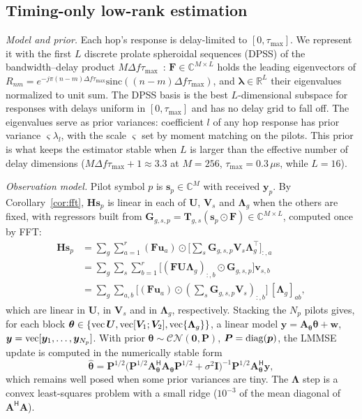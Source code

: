 \subsection{Timing-only low-rank estimation}\label{sec:est}
\emph{Model and prior.} Each hop's response is delay-limited to $[0,\tau_{\max}]$. We
represent it with the first $L$ discrete prolate spheroidal sequences (DPSS) of the
bandwidth--delay product $M\Delta f\tau_{\max}$~\cite{slepian1978,zemen2005}: $\bm F\in\mathbb C^{M\times L}$
holds the leading eigenvectors of $R_{nm}=e^{-j\pi(n-m)\Delta f\tau_{\max}}\mathrm{sinc}((n-m)\Delta f\tau_{\max})$,
and $\bm\lambda\in\mathbb R^{L}$ their eigenvalues normalized to unit sum. The DPSS basis is
the best $L$-dimensional subspace for responses with delays uniform in $[0,\tau_{\max}]$ and
has no delay grid to fall off. The eigenvalues serve as prior variances: coefficient $l$
of any hop response has prior variance $\varsigma\lambda_l$, with the scale $\varsigma$ set by
moment matching on the pilots. This prior is what keeps the estimator stable when $L$ is
larger than the effective number of delay dimensions ($M\Delta f\tau_{\max}+1\approx3.3$ at
$M=256$, $\tau_{\max}=0.3\,\mu$s, while $L=16$).

\emph{Observation model.} Pilot symbol $p$ is $\bm s_p\in\mathbb C^M$ with received $\bm y_p$.
By Corollary~\ref{cor:fft}, $\bm H\bm s_p$ is linear in each of $\bm U$, $\bm V_s$ and $\bm\Lambda_g$
when the others are fixed, with regressors built from
$\bm G_{g,s,p}=\bm T_{g,s}(\bm s_p\odot\bm F)\in\mathbb C^{M\times L}$, computed once by FFT:
\begin{align}
\bm H\bm s_p&=\textstyle\sum_g\sum_{a=1}^{r}(\bm F\bm u_a)\odot\big[\textstyle\sum_s\bm G_{g,s,p}\bm V_s\bm\Lambda_g^{\top}\big]_{:,a}\label{eq:linU}\\
&=\textstyle\sum_g\sum_s\sum_{b=1}^{r}\big[(\bm F\bm U\bm\Lambda_g)_{:,b}\odot\bm G_{g,s,p}\big]\bm v_{s,b}\label{eq:linV}\\
&=\textstyle\sum_g\sum_{a,b}\big[(\bm F\bm u_a)\odot(\textstyle\sum_s\bm G_{g,s,p}\bm V_s)_{:,b}\big]\,[\bm\Lambda_g]_{ab},\label{eq:linL}
\end{align}
which are linear in $\bm U$, in $\bm V_s$ and in $\bm\Lambda_g$, respectively.
Stacking the $N_p$ pilots gives, for each block $\bm\theta\in\{\operatorname{vec}\bm U,\operatorname{vec}[\bm V_1;\bm V_2],\operatorname{vec}\{\bm\Lambda_g\}\}$,
a linear model $\bm y=\bm A_{\bm\theta}\bm\theta+\bm w$, $\bm y=\operatorname{vec}[\bm y_1,\dots,\bm y_{N_p}]$.
With prior $\bm\theta\sim\mathcal{CN}(\bm 0,\bm P)$, $\bm P=\operatorname{diag}(\bm p)$, the LMMSE update is computed in
the numerically stable form
\begin{equation}
\hat{\bm\theta}=\bm P^{1/2}\big(\bm P^{1/2}\bm A_{\bm\theta}^{\mathsf H}\bm A_{\bm\theta}\bm P^{1/2}+\sigma^2\bm I\big)^{-1}\bm P^{1/2}\bm A_{\bm\theta}^{\mathsf H}\bm y,
\label{eq:lmmse}
\end{equation}
which remains well posed when some prior variances are tiny. The $\bm\Lambda$ step is a
convex least-squares problem with a small ridge ($10^{-3}$ of the mean diagonal of
$\bm A^{\mathsf H}\bm A$).

